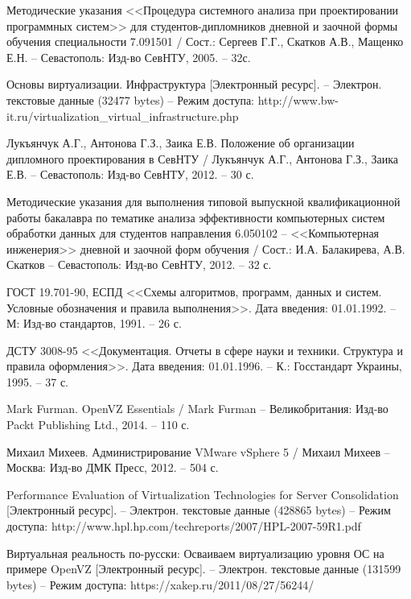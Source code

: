 \begin{thebibliography}{00}
    Методические указания <<Процедура системного анализа при проектировании программных систем>>
    для студентов-дипломников дневной и заочной формы обучения специальности 7.091501 /
    Сост.: Сергеев Г.Г., Скатков А.В., Мащенко Е.Н. -- Севастополь:
    Изд-во СевНТУ, 2005. -- 32с.

    Основы виртуализации. Инфраструктура
    [Электронный ресурс]. --
    Электрон. текстовые данные (32477 bytes) --
    Режим доступа: http://www.bw-it.ru/virtualization\_virtual\_infrastructure.php


 Лукъянчук А.Г., Антонова Г.З., Заика Е.В. 
    Положение об организации дипломного проектирования в СевНТУ / 
    Лукъянчук А.Г., Антонова Г.З., Заика Е.В. -- Севастополь: 
    Изд-во СевНТУ, 2012. -- 30 с.

    Методические указания для выполнения типовой выпускной 
    квалификационной работы бакалавра по тематике анализа эффективности 
    компьютерных систем обработки данных для студентов направления 
    6.050102 -- <<Компьютерная инженерия>> дневной и заочной форм обучения / 
    Сост.: И.А. Балакирева, А.В. Скатков -- Севастополь: Изд-во СевНТУ, 2012. -- 32 с.

    ГОСТ 19.701-90, ЕСПД <<Схемы алгоритмов, программ, данных и систем. 
    Условные обозначения и правила выполнения>>. 
    Дата введения: 01.01.1992. -- М: Изд-во стандартов, 1991. -- 26 с.

    ДСТУ 3008-95 <<Документация. Отчеты в сфере науки и техники. 
    Структура и правила оформления>>. 
    Дата введения: 01.01.1996. -- К.: Госстандарт Украины, 1995. -- 37 с.

    Mark Furman. OpenVZ Essentials /
    Mark Furman -- Великобритания: Изд-во Packt Publishing Ltd.,
    2014. -- 110 с.

    Михаил Михеев. Администрирование VMware vSphere 5 / 
    Михаил Михеев -- Москва: Изд-во ДМК Пресс, 
    2012. -- 504 с.
    
    Performance Evaluation of Virtualization Technologies for Server Consolidation
    [Электронный ресурс]. --
    Электрон. текстовые данные (428865 bytes) --
    Режим доступа: http://www.hpl.hp.com/techreports/2007/HPL-2007-59R1.pdf

    Виртуальная реальность по-русски: Осваиваем виртуализацию уровня ОС на примере OpenVZ
    [Электронный ресурс]. --
    Электрон. текстовые данные (131599 bytes) --
    Режим доступа: https://xakep.ru/2011/08/27/56244/


\end{thebibliography}
